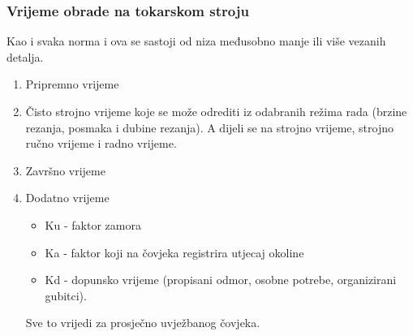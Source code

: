 \documentclass[a4paper,12pt]{article}
\numberwithin{figure}{section}
\begin{document}
\subsubsection{Vrijeme obrade na tokarskom stroju}
Kao i svaka norma i ova se sastoji od niza međusobno manje ili više vezanih detalja.
\begin{enumerate}
\item Pripremno vrijeme
\item Čisto strojno vrijeme koje se može odrediti iz odabranih režima rada (brzine rezanja, posmaka i dubine rezanja). A dijeli se na strojno vrijeme, strojno ručno vrijeme i radno vrijeme.
\item Završno vrijeme
\item Dodatno vrijeme
\begin{itemize}
\item Ku - faktor zamora
\item Ka - faktor koji na čovjeka registrira utjecaj okoline
\item Kd - dopunsko vrijeme (propisani odmor, osobne potrebe, organizirani gubitci).
\end{itemize}
Sve to vrijedi za prosječno uvježbanog čovjeka.
\end{enumerate}
\end{document}
